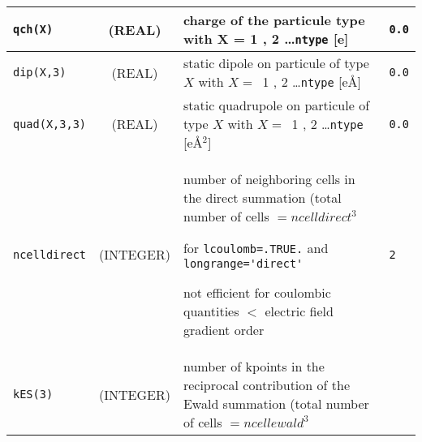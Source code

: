\documentclass[a4paper,8pt]{article}
\begin{document}
\begin{longtable}{l|c|m{8cm}|m{2cm}}
\verb?qch(X)?    &  (REAL)            & charge of the particule type with X = 1 , 2 \ldots \verb?ntype? [e]                 & \verb?0.0?\\
\hline
\rule[-0.75cm]{0cm}{1.5cm}
\verb?dip(X,3)?  &  (REAL)            & static dipole on particule of type $X$ with $X=$~1 , 2 \ldots \verb?ntype? [e\AA]   & \verb?0.0?\\
\hline
\rule[-0.75cm]{0cm}{1.5cm}
\verb?quad(X,3,3)?
                 &  (REAL)            & static quadrupole on particule of type $X$ with $X=$~1 , 2 \ldots \verb?ntype? [e\AA$^2$]  
	                                                                                                                    & \verb?0.0?\\
\hline
\rule[-0.75cm]{0cm}{1.5cm}
\verb?ncelldirect?           
                 &  (INTEGER)         & \newline number of neighboring cells in the direct summation 
                                         (total number of cells $=ncelldirect^3$ \newline 

                                          for \verb?lcoulomb=.TRUE.? and \verb?longrange='direct'?  \newline                  
					  
					  not efficient for coulombic quantities $<$ electric field gradient order          & \verb?2? \\
\hline
\rule[-0.75cm]{0cm}{1.5cm}
\verb?kES(3)?    &  (INTEGER)         & \newline number of kpoints in the reciprocal contribution of the Ewald summation
                                         (total number of cells $=ncellewald^3$ \newline                                      
					 

\end{longtable}
\end{document}

